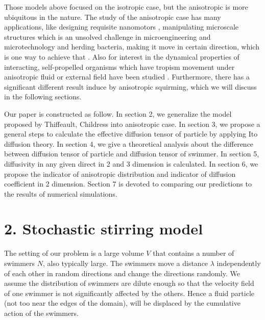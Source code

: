 \documentclass[12pt,a4paper]{article}
\begin{document}
Those models above focused on the isotropic case,
but the anisotropic is more ubiquitous in the nature.
The study of the anisotropic case has many applications,
like designing requisite nanomotors
\cite{SelfPropelling}, manipulating microscale structures which is an
unsolved challenge in microengineering and microtechnology and herding
bacteria, making it move in certain direction, which is one way to achieve
that \cite{Bacterial}. Also for interest in the dynamical properties
of interacting, self-propelled organisms which have tropism movement
under anisotropic fluid \cite{Bacterial} or external field have been
studied \cite{Concentration, Enhance, SwimStress}.
Furthermore, there has a significant different result induce by anisotropic squirming,
which we will discuss in the following sections.

Our paper is constructed as follow. In section 2, we generalize the
model proposed by Thiffeault, Childress \cite{Distribution} into
anisotropic case. In section 3, we propose a general steps to
calculate the effective diffusion tensor of particle by applying Ito
diffusion theory. In section 4, we give a theoretical analysis about
the difference between diffusion tensor of particle and diffusion
tensor of swimmer. In section 5, diffusivity in any given direct in 2
and 3 dimension is calculated. In section 6, we propose the indicator
of anisotropic distribution and indicator of diffusion coefficient in
2 dimension. Section 7 is devoted to comparing our predictions to the
results of numerical simulations.

\section*{\normalsize{2. Stochastic stirring model}}

The setting of our problem is a large volume $V$ that contains a number
of swimmers $N$, also typically large. The swimmers move a distance $\lambda$
independently of each other in random directions and change the
directions randomly. We assume the distribution of swimmers are dilute
enough so that the velocity field of one swimmer is not significantly
affected by the others. Hence a fluid particle (not too near the edges
of the domain), will be displaced by the cumulative action of the
swimmers.
\end{document}
